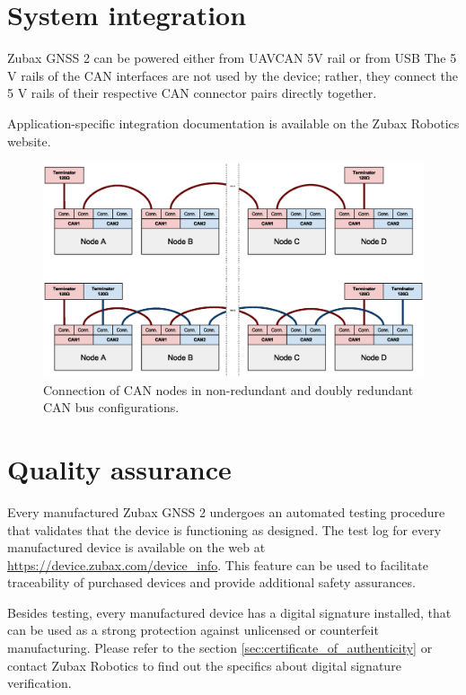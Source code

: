 \documentclass{zubaxdoc}
\begin{document}
\section{System integration}

Zubax GNSS 2 can be powered either from UAVCAN 5V rail or from USB
The 5 V rails of the CAN interfaces are not used by the device; rather,
they connect the 5 V rails of their respective CAN connector pairs directly together.

Application-specific integration documentation is available on the Zubax Robotics website.

\begin{figure}[hb]
    \centering
	\includegraphics[width=\textwidth]{can_daisy_chain}
	\caption{Connection of CAN nodes in non-redundant and doubly redundant CAN bus configurations.
	\label{can_daisy_chain_non_redundant}}
\end{figure}

\section{Quality assurance}

Every manufactured Zubax GNSS 2 undergoes an automated testing procedure that validates that
the device is functioning as designed.
The test log for every manufactured device is available on the web at
\url{https://device.zubax.com/device_info}.
This feature can be used to facilitate traceability of purchased devices and
provide additional safety assurances.

Besides testing, every manufactured device has a digital signature installed,
that can be used as a strong protection against unlicensed or counterfeit manufacturing.
Please refer to the section \ref{sec:certificate_of_authenticity} or contact Zubax Robotics
to find out the specifics about digital signature verification.
\end{document}
